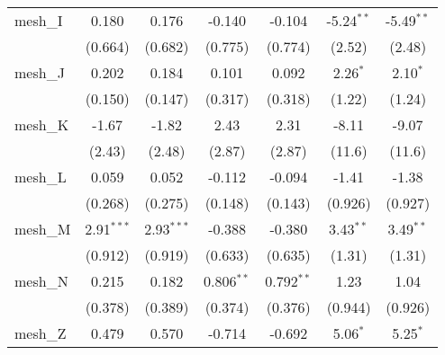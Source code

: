 \begin{tabular}{lcccccc}
   mesh\_I                                                     & 0.180          & 0.176          & -0.140         & -0.104          & -5.24$^{**}$ & -5.49$^{**}$\\   
                                                               & (0.664)        & (0.682)        & (0.775)        & (0.774)         & (2.52)       & (2.48)\\   
   mesh\_J                                                     & 0.202          & 0.184          & 0.101          & 0.092           & 2.26$^{*}$   & 2.10$^{*}$\\   
                                                               & (0.150)        & (0.147)        & (0.317)        & (0.318)         & (1.22)       & (1.24)\\   
   mesh\_K                                                     & -1.67          & -1.82          & 2.43           & 2.31            & -8.11        & -9.07\\   
                                                               & (2.43)         & (2.48)         & (2.87)         & (2.87)          & (11.6)       & (11.6)\\   
   mesh\_L                                                     & 0.059          & 0.052          & -0.112         & -0.094          & -1.41        & -1.38\\   
                                                               & (0.268)        & (0.275)        & (0.148)        & (0.143)         & (0.926)      & (0.927)\\   
   mesh\_M                                                     & 2.91$^{***}$   & 2.93$^{***}$   & -0.388         & -0.380          & 3.43$^{**}$  & 3.49$^{**}$\\   
                                                               & (0.912)        & (0.919)        & (0.633)        & (0.635)         & (1.31)       & (1.31)\\   
   mesh\_N                                                     & 0.215          & 0.182          & 0.806$^{**}$   & 0.792$^{**}$    & 1.23         & 1.04\\   
                                                               & (0.378)        & (0.389)        & (0.374)        & (0.376)         & (0.944)      & (0.926)\\   
   mesh\_Z                                                     & 0.479          & 0.570          & -0.714         & -0.692          & 5.06$^{*}$   & 5.25$^{*}$\\   

\end{tabular}
